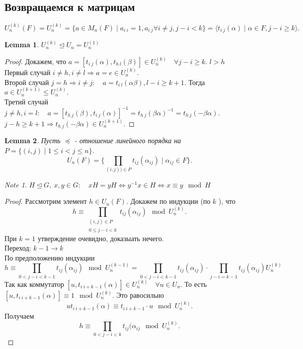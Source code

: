 \documentclass[11pt]{book}
\theoremstyle{definition}
\theoremstyle{plain}
\theoremstyle{plain}
\newtheorem*{lm}{Lemma}
\theoremstyle{definition}
\theoremstyle{remark}
\newtheorem*{note}{Note}
\begin{document}
\subsection{Возвращаемся к матрицам}
\[
    U^{(k)}_n (F) = U_n ^{(k)} = \{a \in  M_n(F) \mid a_{i~i} = 1, a_{i~j} \forall i \ne j, j-i < k\} = \langle t_{i ~j}(\alpha ) \mid \alpha  \in F, j - i \ge k \rangle
.\] 
\begin{lm}
    $U_n^{(k)} \trianglelefteq U_n = U_n^{(1)}$
\end{lm}
\begin{proof}
    Докажем, что $a = [t_{i~j}(\alpha ), t_{h~l} (\beta )] \in  U_n^{(k)} \quad \forall j - i \ge  k$. $l > h$\\
    Первый случай $i \ne h, i \ne l \Rightarrow a = e \in  U_n^{(k)}$. \\
    Второй случай $j = h \Rightarrow  i \ne j: \quad a =t_{i~l}(\alpha  \beta ), l -i \ge  k+1$. Тогда $a \in U_n^{(k+1)} \le  U_n^{(k)}$.\\
    Третий случай $j \ne h, i=l: \quad a = [t_{h~j}(\beta ), t_{i~j}(\alpha )]^{-1} = t_{h~j}(\beta  \alpha )^{-1} = t_{h~j}(-\beta \alpha )$. $j -h \ge k+1 \Rightarrow  t_{h~j}(-\beta \alpha ) \in  U_n^{(k+1)}$.
\end{proof}
\begin{lm}
    Пусть  $\preccurlyeq$ - отношение линейного порядка на $P = \{(i, j) \mid 1 \le  i < j \le  n\}$.
    \[
	U_n(F) = \{\prod\limits_{(i, j)) \in  P} t_{ij} (\alpha _{ij})\mid \alpha _{ij} \in F\}
    .\] 
\end{lm}
\begin{note}
    $H \trianglelefteq G, ~x, y \in  G: \quad xH = y H \Leftrightarrow y^{-1}x \in  H \Leftrightarrow x \equiv y \mod H $
\end{note}
\begin{proof}
    Рассмотрим элемент $h \in  U_n(F)$. Докажем по индукции (по $k$ ), что 
    \[
    h \equiv \prod\limits_{
	\begin{array}{c}
	    (i, j) \in  P \\
	    0 \le  j - i < k
    \end{array}}
    t_{ij}(\alpha _{ij}) \mod U_n^{(k)}
    .\] 
    При $k = 1$ утверждение очевидно, доказыать нечего. \\
    Переход: $k-1 \to  k$ \\
    По предположению индукции $$h \equiv \prod\limits_{0< j - i < k-1}t_{ij}(\alpha _{ij}) \mod U^{(k-1)}_n =
    \prod\limits_{0<j-i< k-1}t_{ij} (\alpha _{ij}) \cdot \prod\limits_{j -i = k-1} t_{ij} (\alpha _{ij}) U_n^{(k)}$$
	Так как коммутатор $[u, t_{i ~ i+k-1} (\alpha )] \in  U_n^{(k)} \quad \forall u \in  U_n$. То есть $[u, t_{i~ i+k-1} (\alpha )] \equiv 1 \mod U_n^{(k)}$. 
	Это равосильно \[
	    ut_{i~i+k-1} (\alpha ) \equiv t_{i~i+k-1} \cdot u \mod U_n^{(k)}
	.\] 
	Получаем
	\[
	    h \equiv \prod\limits_{0<j-i<k} t_{ij}(\alpha _{ij} \mod U_n^{(k)}
	.\] 

\end{proof}
\end{document}
